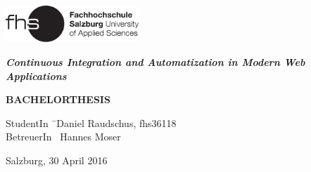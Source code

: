 \begin{titlepage}
\begin{center}

\includegraphics[width=5cm]{images/FHSLogo.pdf}

\vspace*{4cm}

\Large{
	\textit{\textbf{Continuous Integration and Automatization in Modern Web Applications}}
}

\vspace*{4cm}

\large{
	\textbf{BACHELORTHESIS}
}

\end{center}

\vfill

\begin{tabbing}
StudentIn \= \ Daniel Raudschus, fhs36118 \\
BetreuerIn \> \ Hannes Moser
\end{tabbing}

Salzburg, 30 April 2016

\end{titlepage}

